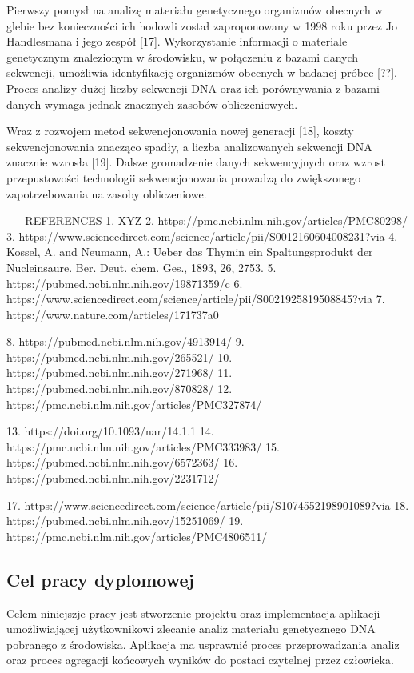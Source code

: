 Pierwszy pomysł na analizę materiału genetycznego organizmów obecnych w glebie bez 
konieczności ich hodowli został zaproponowany w 1998 roku przez Jo Handlesmana i 
jego zespół [17]. Wykorzystanie informacji o materiale genetycznym znalezionym w 
środowisku, w połączeniu z bazami danych sekwencji, umożliwia identyfikację organizmów 
obecnych w badanej próbce [??]. Proces analizy dużej liczby sekwencji DNA oraz ich 
porównywania z bazami danych wymaga jednak znacznych zasobów obliczeniowych.

Wraz z rozwojem metod sekwencjonowania nowej generacji [18], koszty sekwencjonowania 
znacząco spadły, a liczba analizowanych sekwencji DNA znacznie wzrosła [19]. Dalsze 
gromadzenie danych sekwencyjnych oraz wzrost przepustowości technologii sekwencjonowania 
prowadzą do zwiększonego zapotrzebowania na zasoby obliczeniowe.


---- REFERENCES 
1. XYZ
2. https://pmc.ncbi.nlm.nih.gov/articles/PMC80298/
3. https://www.sciencedirect.com/science/article/pii/S0012160604008231?via%
4. Kossel, A. and Neumann, A.: Ueber das Thymin ein Spaltungsprodukt der Nucleinsaure. Ber. Deut. chem. Ges., 1893, 26, 2753.
5. https://pubmed.ncbi.nlm.nih.gov/19871359/c
6. https://www.sciencedirect.com/science/article/pii/S0021925819508845?via%
7. https://www.nature.com/articles/171737a0

8. https://pubmed.ncbi.nlm.nih.gov/4913914/
9. https://pubmed.ncbi.nlm.nih.gov/265521/
10. https://pubmed.ncbi.nlm.nih.gov/271968/
11. https://pubmed.ncbi.nlm.nih.gov/870828/
12. https://pmc.ncbi.nlm.nih.gov/articles/PMC327874/

13. https://doi.org/10.1093/nar/14.1.1
14. https://pmc.ncbi.nlm.nih.gov/articles/PMC333983/
15. https://pubmed.ncbi.nlm.nih.gov/6572363/
16. https://pubmed.ncbi.nlm.nih.gov/2231712/

17. https://www.sciencedirect.com/science/article/pii/S1074552198901089?via%
18. https://pubmed.ncbi.nlm.nih.gov/15251069/
19. https://pmc.ncbi.nlm.nih.gov/articles/PMC4806511/


    \subsection {
        Cel pracy dyplomowej
    }

        Celem niniejszje pracy jest stworzenie projektu oraz implementacja aplikacji 
        umożliwiającej użytkownikowi zlecanie analiz materiału genetycznego DNA pobranego
        z środowiska. Aplikacja ma usprawnić proces przeprowadzania analiz oraz proces 
        agregacji końcowych wyników do postaci czytelnej przez człowieka.

